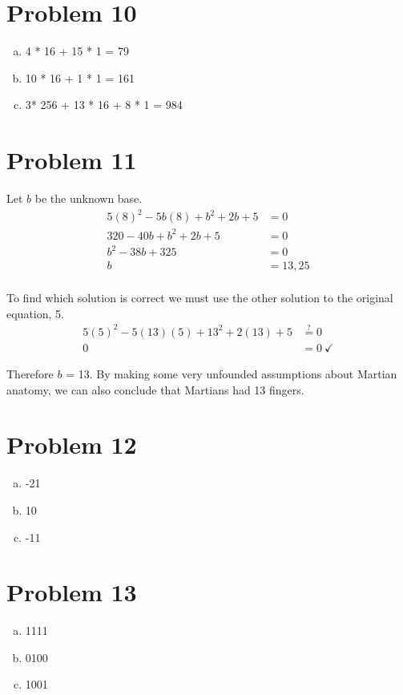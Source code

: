 \documentclass[11pt]{article}
\begin{document}
\section*{Problem 10}
\begin{enumerate}[(a)]
	\item 4 * 16 + 15 * 1 = 79
	\item 10 * 16 + 1 * 1 = 161
	\item 3* 256 + 13 * 16 + 8 * 1 = 984
\end{enumerate}

\section*{Problem 11}
Let $b$ be the unknown base.
\begin{align*}
5(8)^2 - 5b(8) + b^2 + 2b + 5 &= 0 \\
320 - 40b+b^2+2b+5 &= 0 \\
b^2 -38b+ 325 &= 0 \\	
b &= 13, 25 \\
\end{align*}

To find which solution is correct we must use the other solution to the original equation, 5.
\begin{align*}
5(5)^2 - 5(13)(5) +13^2+2(13)+5 &\stackrel{?}{=} 0\\
0 &= 0\ \checkmark
\end{align*}

Therefore $b$ = 13. By making some very unfounded assumptions about Martian anatomy, we can also conclude that Martians had 13 fingers.

\section*{Problem 12}
\begin{enumerate}[(a)]
	\item -21
	\item 10
	\item -11
\end{enumerate}

\section*{Problem 13}
\begin{enumerate}[(a)]
	\item 1111
	\item 0100
	\item 1001
\end{enumerate}
\end{document}
